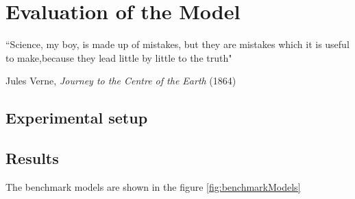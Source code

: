 
\chapter{Evaluation of the Model} %

\label{Chapter5} %


``Science, my boy, is made up of mistakes, but they are mistakes which it is useful to make,because
they lead little by little to the truth"

\begin{flushright}
Jules Verne, \textit{Journey to the Centre of the Earth} (1864)
\end{flushright}


\section{Experimental setup}

\section{Results}
The benchmark models are shown in the figure \ref{fig:benchmarkModels}

